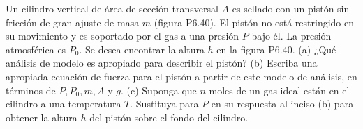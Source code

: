 \item Un cilindro vertical de área de sección transversal $A$ es sellado con un pistón sin fricción de gran ajuste de masa $m$ (figura P6.40). El pistón no está restringido en su movimiento y es soportado por el gas a una presión $P$ bajo él. La presión atmosférica es $P_0$. Se desea encontrar la altura $h$ en la figura P6.40. 
(a) ¿Qué análisis de modelo es apropiado para describir el pistón? 
(b) Escriba una apropiada ecuación de fuerza para el pistón a partir de este modelo de análisis, en términos de $P, P_0, m, A$ y $g$. 
(c) Suponga que $n$ moles de un gas ideal están en el cilindro a una temperatura $T$. Sustituya para $P$ en su respuesta al inciso (b) para obtener la altura $h$ del pistón sobre el fondo del cilindro.
